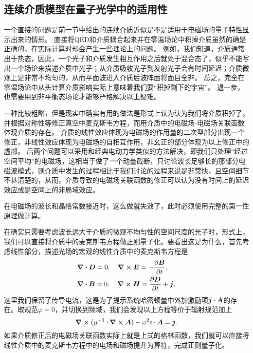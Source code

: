 \subsection{连续介质模型在量子光学中的适用性}\label{sec:quantum-continuum}

一个直接的问题是前一节中给出的连续介质近似是不是适用于电磁场的量子特性显示出来的情形。
直接将QED和介质耦合起来并在零温场论中积掉介质虽然的确是正确的，在实际计算时却会产生一些理论上的问题。
例如，我们知道，介质通常出于热态，因此，一个光子和介质发生相互作用之后就处于混合态了，似乎不能写出一个场论来描述介质中光子；从介质吸收光子到发射光子会有时间延迟；介质微观上是非常不均匀的，从而平面波进入介质后波阵面将面目全非。
总之，完全在零温场论中从头计算介质影响实际上意味着我们要“积掉剩下的宇宙”。
退一步，也需要用到非平衡态场论才能够严格解决以上疑难。

一种比较粗略，但是现实中确实有用的做法是形式上认为认为我们将介质积掉了，并根据对称性等修正真空中麦克斯韦方程，而用介质中的电磁场-电磁场关联函数体现介质的存在。
介质的线性效应体现为电磁场的作用量的二次型部分出现一个修正，非线性效应体现为电磁场的自相互作用，非幺正的部分体现为以上修正中的虚部。
后两个问题可以采用和经典电动力学类似的方法解决，即我们只处理“经过空间平均”的电磁场，这相当于做了一个动量截断，只讨论波长足够长的那部分电磁波模式，则介质中发生的过程相比于我们讨论的过程来说是非常快、且空间细节不甚清楚的，从而，介质导致的电磁场关联函数的修正可以认为没有时间上的延迟效应或是空间上的非局域效应。

在电磁场的波长和晶格常数接近时，这么做就失效了，此时必须使用完整的第一性原理做计算。

在确实只需要考虑波长远大于介质的微观不均匀性的空间尺度的光子时，形式上，我们可以直接将介质中的麦克斯韦方程做正则量子化。要看出这是为什么，首先考虑线性部分，描述光场的宏观的线性介质中的麦克斯韦方程是
\[
    \begin{aligned}
        &\div{\vb*{D}} = 0, \quad \curl{\vb*{E}} = - \pdv{\vb*{B}}{t}, \\
        &\div{\vb*{B}} = 0, \quad \curl{\vb*{H}} = \pdv{\vb*{D}}{t} + \vb*{j},
    \end{aligned}
\]
这里我们保留了传导电流，这是为了提示系统哈密顿量中外加激励项$\vb*{j} \cdot \vb*{A}$的存在。取规范$\varphi=0$，并切换到频域，我们会发现以上方程等价于辐射规范加上
\begin{equation}
    \curl{(\mu^{-1} \cdot \curl{\vb*{A}})} - \omega^2 \epsilon \cdot \vb*{A} = \vb*{j}.
    \label{eq:photon-in-material}
\end{equation}
如果介质修正后的电磁场关联函数实际上就是上式的格林函数，我们就可以直接将线性介质中的麦克斯韦方程中的电场和磁场提升为算符，完成正则量子化。

